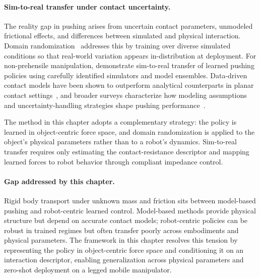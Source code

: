 \paragraph{Sim-to-real transfer under contact uncertainty.}
The reality gap in pushing arises from uncertain contact parameters, unmodeled frictional effects, and differences between simulated and physical interaction. Domain randomization~\citep{tobin2017domain,peng2018sim} addresses this by training over diverse simulated conditions so that real-world variation appears in-distribution at deployment. For non-prehensile manipulation, \citet{lowrey2018simtoreal} demonstrate sim-to-real transfer of learned pushing policies using carefully identified simulators and model ensembles. Data-driven contact models have been shown to outperform analytical counterparts in planar contact settings~\citep{fazeli2017learning}, and broader surveys characterize how modeling assumptions and uncertainty-handling strategies shape pushing performance~\citep{stuber2020survey}.

The method in this chapter adopts a complementary strategy: the policy is learned in object-centric force space, and domain randomization is applied to the object's physical parameters rather than to a robot's dynamics. Sim-to-real transfer requires only estimating the contact-resistance descriptor and mapping learned forces to robot behavior through compliant impedance control.

\paragraph{Gap addressed by this chapter.}
Rigid body transport under unknown mass and friction sits between model-based pushing and robot-centric learned control. Model-based methods provide physical structure but depend on accurate contact models; robot-centric policies can be robust in trained regimes but often transfer poorly across embodiments and physical parameters. The framework in this chapter resolves this tension by representing the policy in object-centric force space and conditioning it on an interaction descriptor, enabling generalization across physical parameters and zero-shot deployment on a legged mobile manipulator.
